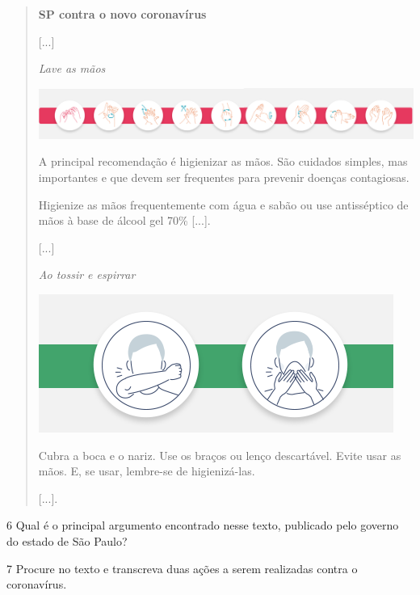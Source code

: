 \begin{quote}
\textbf{SP contra o novo coronavírus}

{[}...{]}

\textit{Lave as mãos}

\includegraphics[width=\textwidth]{./imgs/img12ab.png}

A principal recomendação é higienizar as mãos. São cuidados simples,
mas importantes e que devem ser frequentes para prevenir doenças
contagiosas.

Higienize as mãos frequentemente com água e sabão ou use antisséptico de
mãos à base de álcool gel 70\% {[}...{]}.

{[}...{]}

\begin{center}
\textit{Ao tossir e espirrar}

\includegraphics[width=.5\textwidth]{./imgs/img14.png}
\end{center}

Cubra a boca e o nariz. Use os braços ou lenço descartável. Evite usar
as mãos. E, se usar, lembre-se de higienizá-las.

{[}...{]}.

\end{quote}

\num{6} Qual é o principal argumento encontrado nesse texto, publicado pelo governo do estado de São Paulo?



\num{7} Procure no texto e transcreva duas ações a serem realizadas contra o
coronavírus.


